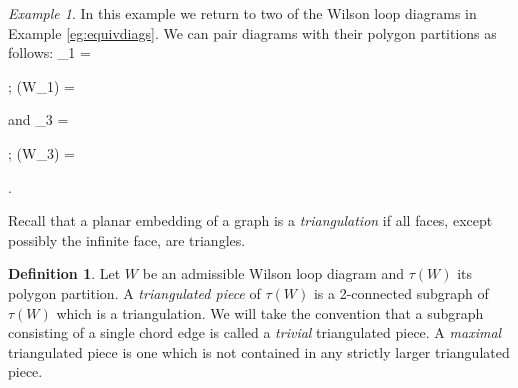 \documentclass[11pt]{article}
\newcommand{\drawWLD}[2]{

\pgfmathsetmacro{\n}{#1}
\pgfmathsetmacro{\radius}{#2}
\pgfmathsetmacro{\angle}{360/\n}
\draw (0,0) circle (\radius);
    \foreach \i in {1,2,...,\n} {
      \draw (\angle*\i:\radius) node {$\bullet$};
    }

}
\newcommand{\drawpolypart}[2]{
\pgfmathsetmacro{\n}{#1}
\pgfmathsetmacro{\radius}{#2}
\pgfmathsetmacro{\angle}{360/\n}
    \foreach \i in {1,2,...,\n} {
      \draw (\angle*\i+ \angle/2:\radius) node {$\bullet$};
     \pgfmathsetmacro{\x}{\angle*\i - \angle/2}
      \pgfmathsetmacro{\concave}{((\n-1.5)/\n)}
      \draw (\x:\radius cm) .. controls (\angle *\i: \concave* \radius cm) .. (\x + \angle:\radius cm);
    }

}
\newcommand{\drawprop}[4]{
\pgfmathsetmacro{\r}{#1}
\pgfmathsetmacro{\bumpr}{#2}
\pgfmathsetmacro{\s}{#3}
\pgfmathsetmacro{\bumps}{#4}
\pgfmathsetmacro{\perturbe}{\angle/\n}

\begin{scope}
\draw[propagator] (\angle*\r + \angle/2 + \bumpr*\perturbe:\radius) -- (\angle*\s + \angle/2 + \bumps*\perturbe:\radius);
\end{scope}
}
\newcommand{\drawchord}[2]{
\pgfmathsetmacro{\r}{#1}
\pgfmathsetmacro{\s}{#2}

\begin{scope}
\draw (\angle*\r + \angle/2:\radius) -- (\angle*\s + \angle/2:\radius);
\end{scope}
}
\newcommand{\drawnumbers}{
  \foreach \i in {1,2,...,\n} {
  \pgfmathsetmacro{\x}{\angle*\i}
  \draw (\x:\radius*1.15) node {\footnotesize \i};
}
}
\newcommand{\drawnumbersshift}{
  \foreach \i in {1,2,...,\n} {
  \pgfmathsetmacro{\x}{\angle*\i + \angle/2}
  \draw (\x:\radius*1.15) node {\footnotesize \i};
}
}
\def\bas #1\eas{\begin{align*} #1 \end{align*}}
\theoremstyle{remark}
\newtheorem{eg}[thm]{Example}
\theoremstyle{definition}
\newtheorem{dfn}[thm]{Definition}
\begin{document}
\begin{eg}\label{WLDtopolygonpartition}
In this example we return to two of the Wilson loop diagrams in Example \ref{eg:equivdiags}. We can pair diagrams with their polygon partitions as follows:
\bas W_1 =  \quad; \quad
\tau(W_1) = 
\eas and
\bas W_3 = \quad; \quad
\tau(W_3) =  .
\eas

\end{eg}

Recall that a planar embedding of a graph is a \emph{triangulation} if all faces, except possibly the infinite face, are triangles.

\begin{dfn}
  Let $W$ be an admissible Wilson loop diagram and $\tau(W)$ its polygon partition. A \emph{triangulated piece} of $\tau(W)$ is a 2-connected subgraph of $\tau(W)$ which is a triangulation. We will take the convention that a subgraph consisting of a single chord edge is called a \emph{trivial} triangulated piece.
A {\em maximal} triangulated piece is one which is not contained in any strictly larger triangulated piece.
\end{dfn}
\end{document}
